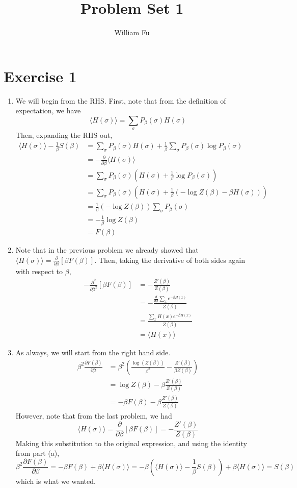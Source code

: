 \documentclass[11pt]{article}
\author{William Fu}
\title{Problem Set 1}
\theoremstyle{definition}
\begin{document}
\section{Exercise 1}

\begin{enumerate}
\item 
We will begin from the RHS. First, note that from the definition of expectation, we have
\[ \langle H(\sigma) \rangle = \sum_\sigma P_\beta(\sigma) H(\sigma) \]
Then, expanding the RHS out,
\begin{align*}
	\langle H(\sigma) \rangle - \frac{1}{\beta}S(\beta) 
	&=  \sum_\sigma P_\beta(\sigma) H(\sigma) + \frac{1}{\beta} \sum_\sigma P_\beta(\sigma) \log P_\beta(\sigma) \\
	&= - \frac{\partial}{\partial \beta} \langle H(\sigma) \rangle \\
	&= \sum_\sigma P_\beta(\sigma)\left( H(\sigma) + \frac{1}{\beta} \log P_\beta(\sigma) \right) \\
	&= \sum_\sigma P_\beta(\sigma)\left( H(\sigma) + \frac{1}{\beta}(-\log Z(\beta) - \beta H(\sigma) )\right) \\
	&= \frac{1}{\beta}\left(-\log Z(\beta)\right) \sum_\sigma P_\beta(\sigma) \\
	&= -\frac{1}{\beta} \log Z(\beta) \\
	&= F(\beta)
\end{align*}

\item
	Note that in the previous problem we already showed that $\langle H(\sigma) \rangle = \frac{\partial}{\partial \beta }[\beta F(\beta)]$. Then, taking the derivative of both sides again with respect to $\beta$,
\begin{align*}
	- \frac{\partial^2}{\partial \beta^2}[\beta F(\beta)]
	&= -\frac{Z'(\beta)}{Z(\beta)} \\
	&= -\frac{\frac{d}{d\beta} \sum_x e^{-\beta H(x)}}{Z(\beta)} \\
	&= \frac{\sum_x H(x) e^{-\beta H(x)}}{Z(\beta)} \\
	&= \langle H(x) \rangle
\end{align*}

\item 
	As always, we will start from the right hand side.
	\begin{align*}
		\beta^2 \frac{\partial F(\beta)}{\partial \beta}
		&= \beta^2 \left(\frac{\log (Z(\beta ))}{\beta ^2}-\frac{Z'(\beta )}{\beta  Z(\beta )}\right) \\
		&= \log Z(\beta) - \beta \frac{Z'(\beta)}{Z(\beta)} \\
		&= - \beta F(\beta) - \beta \frac{Z'(\beta)}{Z(\beta)} 
	\end{align*}
However, note that from the last problem, we had
\[ \langle H(\sigma) \rangle = \frac{\partial}{\partial \beta}[\beta F(\beta)] = -\frac{Z'(\beta)}{Z(\beta)}\]
Making this substitution to the original expression, and using the identity from part (a),
\[ \beta^2\frac{\partial F(\beta)}{\partial \beta} = -\beta F(\beta) + \beta \langle H (\sigma) \rangle
= -\beta\left( \langle H(\sigma) \rangle - \frac{1}{\beta} S(\beta) \right)  + \beta \langle H (\sigma) \rangle
= S(\beta)\]
which is what we wanted.


\end{enumerate}
\end{document}
